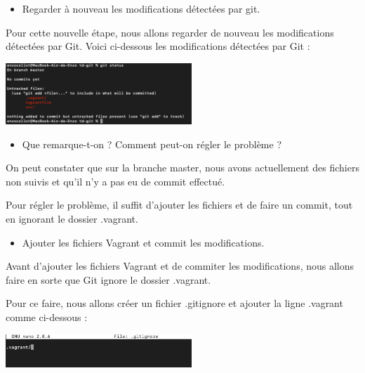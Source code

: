 \documentclass[12pt]{article}
\begin{document}
\begin{itemize}
  \item Regarder à nouveau les modifications détectées par git.
\end{itemize}

Pour cette nouvelle étape, nous allons regarder de nouveau les modifications détectées par Git. Voici ci-dessous les modifications détectées par Git :

\vspace{0.3cm}

\begin{center}
  \includegraphics[width=7cm]{Image-TD-Git-1/git-status-2.png}
\end{center}

\vspace{0.3cm}

\begin{itemize}
  \item Que remarque-t-on ? Comment peut-on régler le problème ?
\end{itemize}

On peut constater que sur la branche master, nous avons actuellement des fichiers non suivis et qu'il n'y a pas eu de commit effectué. \newline

Pour régler le problème, il suffit d'ajouter les fichiers et de faire un commit, tout en ignorant le dossier .vagrant.

\vspace{0.3cm}

\begin{itemize}
  \item Ajouter les fichiers Vagrant et commit les modifications.
\end{itemize}

Avant d'ajouter les fichiers Vagrant et de commiter les modifications, nous allons faire en sorte que Git ignore le dossier .vagrant. \newline

Pour ce faire, nous allons créer un fichier .gitignore et ajouter la ligne .vagrant comme ci-dessous :

\vspace{0.3cm}

\begin{center}
  \includegraphics[width=7cm]{Image-TD-Git-1/gitignore.png}
\end{center}
\end{document}
